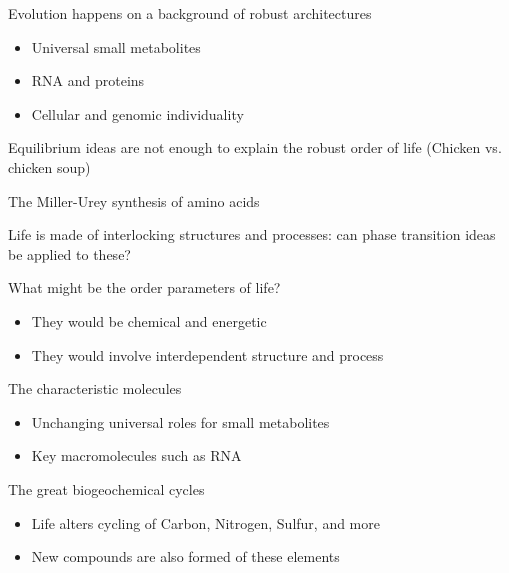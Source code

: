 \documentclass[]{article}
\begin{document}
\begin{appendices}
Evolution happens on a background of robust architectures
\begin{itemize}
	\item Universal small metabolites
	\item RNA and proteins
	\item Cellular and genomic individuality
\end{itemize}

Equilibrium ideas are not enough to explain the robust order of life (Chicken vs. chicken soup)


The Miller-Urey synthesis of amino acids\cite{miller1959organic}

Life is made of interlocking structures and processes: can phase transition ideas
be applied to these?

What might be the order parameters of life?

\begin{itemize}
	\item They would be chemical and energetic
	\item They would involve interdependent	structure and process
\end{itemize}

The characteristic molecules
\begin{itemize}
	\item Unchanging universal roles 	for small metabolites
	\item Key macromolecules such as RNA
\end{itemize}

The great biogeochemical cycles
\begin{itemize}
	\item Life alters cycling of Carbon, Nitrogen, Sulfur, and more
	\item New compounds are also formed of 	these elements
\end{itemize}


\end{appendices}
\end{document}
